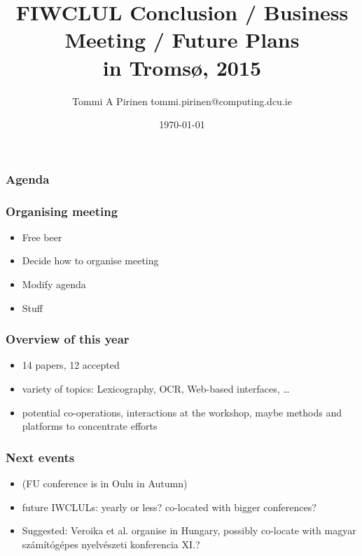 \documentclass{beamer}
\title{FIWCLUL Conclusion / Business Meeting / Future Plans\\
\scriptsize{in Tromsø, 2015}}
\author{Tommi A Pirinen \scriptsize \guilsinglleft tommi.pirinen@computing.dcu.ie \guilsinglright }
\institute{DCU, CNGL}
\date{\today}
\makeatletter
\newcommand\listofframes{\@starttoc{lbf}}
\makeatother
\begin{document}

\maketitle

\begin{frame}
    \frametitle{Agenda}
    \listofframes
\end{frame}

\begin{frame}
    \frametitle{Organising meeting}
    \begin{itemize}
        \item Free beer
        \item Decide how to organise meeting
        \item Modify agenda
        \item Stuff
    \end{itemize}
\end{frame}

\begin{frame}
    \frametitle{Overview of this year}
    \begin{itemize}
        \item 14 papers, 12 accepted
        \item variety of topics: Lexicography, OCR, Web-based interfaces,
            \ldots
        \item potential co-operations, interactions at the workshop,
            maybe methods and platforms to concentrate efforts
    \end{itemize}
\end{frame}

\begin{frame}
    \frametitle{Next events}
    \begin{itemize}
        \item (FU conference is in Oulu in Autumn)
        \item future IWCLULs: yearly or less? co-located with bigger
            conferences?
        \item Suggested: Veroika et al. organise in Hungary, possibly
            co-locate with magyar számítógépes nyelvészeti konferencia XI.?
    \end{itemize}
\end{frame}
\end{document}
